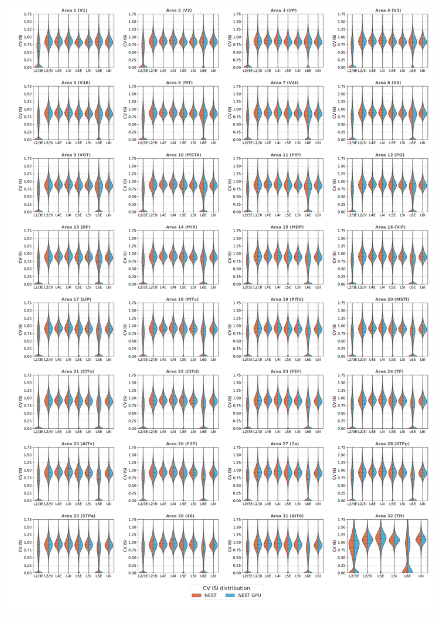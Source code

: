 \documentclass[a4paper, 12pt, twoside, openright]{book}
\begin{document}
\begin{figure}[H]
    \centering
    \includegraphics[width=\columnwidth]{figures/dist_violinplot_vert_gs_CV_ISI.pdf}
\end{figure}
\end{document}
